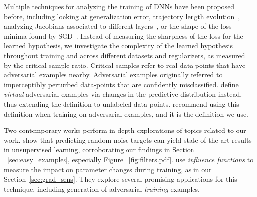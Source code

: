 \documentclass{article}
\begin{document}
Multiple techniques for analyzing the training of DNNs have been proposed before, including looking at generalization error, trajectory length evolution~\citep{raghu2016expressive}, analyzing Jacobians associated to different layers~\citep{wang2016analysis, saxe2013exact}, or the shape of the loss minima found by SGD~\citep{im2016empirical, chaudhari2016entropy, keskar2016large}.
Instead of measuring the sharpness of the loss for the learned hypothesis, we investigate the complexity of the learned hypothesis throughout training and across different datasets and regularizers, as measured by the critical sample ratio. 
Critical samples refer to real data-points that have adversarial examples \citep{adversarial_examples,goodfellow2014explaining} nearby.
Adversarial examples originally referred to imperceptibly perturbed data-points that are confidently misclassified.
\citep{ miyato2015distributional} define {\it virtual} adversarial examples via changes in the predictive distribution instead, thus extending the definition to unlabeled data-points.
\citet{kurakin2016adversarial} recommend using this definition when training on adversarial examples, and it is the definition we use.



Two contemporary works perform in-depth explorations of topics related to our work.
\citet{bojanowski2017} show that predicting random noise targets can yield state of the art results in unsupervised learning, corroborating our findings in Section ~\ref{sec:easy_examples}, especially Figure ~\ref{fig:filters.pdf}.
\citet{koh2017understanding} use {\it influence functions} to measure the impact on parameter changes during training, as in our Section~\ref{sec:grad_sens}.
They explore several promising applications for this technique, including generation of adversarial {\it training} examples.
















\end{document}
